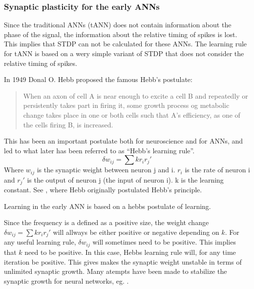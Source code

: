 
		\subsubsection{Synaptic plasticity for the early ANNs}
Since the traditional ANNs (tANN) does not contain information about the phase of the signal, the information about the relative timing of spikes is lost. This implies that STDP can not be calculated for these ANNs. 
The learning rule for tANN is based on a wery simple variant of STDP that does not consider the relative timing of spikes.

In 1949 Donal O. Hebb proposed the famous Hebb's postulate:
\begin{quote}
When an axon of cell A is near enough to excite a cell B and repeatedly or persistently takes part in firing it, some growth process og metabolic change takes place in one or both cells such that A's efficiency, as one of the cells firing B, is increased.\cite{Hebb1949Kap4}
\end{quote}

This has been an important postulate both for neuroscience and for ANNs, and led to what later has been referred to as ``Hebb's learning rule''.
\begin{equation}
	\delta w_{ij} = \sum{k r_i r_j'}
\end{equation}
Where $w_{ij}$ is the synaptic weight between neuron j and i. $r_i$ is the rate of neuron i and $r_j'$ is the output of neuron j (the input of neuron i). \mbox{k} is the learning constant. See \cite{Hebb1949Kap4}, where Hebb originally postulated Hebb's principle.

Learning in the early ANN is based on a hebbs postulate of learning. %

Since the frequency is a defined as a positive size, the weight change $\delta w_{ij} = \sum{k r_i r_j'}$ will allways be either positive or negative depending on $k$. 
For any useful learning rule, $\delta w_{ij}$ will sometimes need to be positive. This implies that $k$ need to be positive. In this case, Hebbs learning rule will, for any time iteration be positive. 
This gives makes the synaptic weight unstable in terms of unlimited synaptic growth. Many atempts have been made to stabilize the synaptic growth for neural networks, eg. \cite{hebbUstabilt}.


